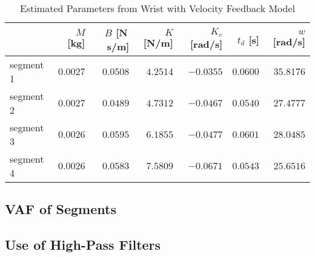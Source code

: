 \documentclass[11pt,a4paper]{article}
\begin{document}
\begin{table}
    \centering
    \begin{tabular}{|l|r|r|r|r|r|r|}
        \hline
        \nonumber & $M$ [kg] & $B$ [N\,s/m] & $K$ [N/m] & $K_v$ [rad/s] &
            $t_d$ [s] & $w$ [rad/s] \\
        \hline
        segment 1 &
            $0.0027$ & $0.0508$ & $4.2514$ & $-0.0355$ & $0.0600$ & $35.8176$ \\
        segment 2 &
            $0.0027$ & $0.0489$ & $4.7312$ & $-0.0467$ & $0.0540$ & $27.4777$ \\
        segment 3 &
            $0.0026$ & $0.0595$ & $6.1855$ & $-0.0477$ & $0.0601$ & $28.0485$ \\
        segment 4 &
            $0.0026$ & $0.0583$ & $7.5809$ & $-0.0671$ & $0.0543$ & $25.6516$ \\
        \hline
    \end{tabular}
    \caption{Estimated Parameters from Wrist with Velocity Feedback Model}
    \label{tab:segparam}
\end{table}


\subsection{VAF of Segments}

\subsection{Use of High-Pass Filters}
\end{document}
